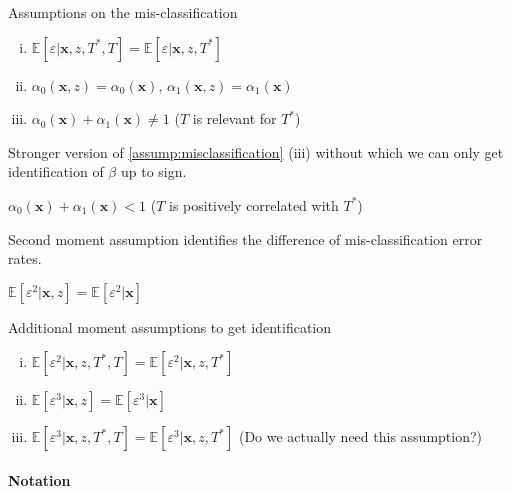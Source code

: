 \documentclass[12pt]{article}
\begin{document}
\noindent Assumptions on the mis-classification
\begin{assump} \mbox{}
  \label{assump:misclassification}
  \begin{enumerate}[(i)] 
    \item $\mathbb{E}[\varepsilon|\mathbf{x},z,T^*,T] = \mathbb{E}[\varepsilon|\mathbf{x},z, T^*]$
    \item $\alpha_0(\mathbf{x},z) = \alpha_0(\mathbf{x})$,   $\alpha_1(\mathbf{x},z) = \alpha_1(\mathbf{x})$
    \item $\alpha_0(\mathbf{x}) + \alpha_1(\mathbf{x}) \neq 1$ ($T$ is relevant for $T^*$)
  \end{enumerate}
\end{assump}

\noindent Stronger version of \ref{assump:misclassification} (iii) without which we can only get identification of $\beta$ up to sign.
\begin{assump}
  \label{assump:extent}
  $\alpha_0(\mathbf{x}) + \alpha_1(\mathbf{x}) <1$ ($T$ is positively correlated with $T^*$)
\end{assump}

\noindent Second moment assumption identifies the difference of mis-classification error rates.
\begin{assump} \mbox{}
  \label{assump:2ndMoment}
    $\mathbb{E}[\varepsilon^2|\mathbf{x},z] = \mathbb{E}[\varepsilon^2|\mathbf{x}]$ 
\end{assump}

\noindent Additional moment assumptions to get identification
\begin{assump} \mbox{}
  \begin{enumerate}[(i)] 
    \item $\mathbb{E}[\varepsilon^2|\mathbf{x},z,T^*,T] = \mathbb{E}[\varepsilon^2|\mathbf{x},z, T^*]$
    \item $\mathbb{E}[\varepsilon^3|\mathbf{x},z] = \mathbb{E}[\varepsilon^3|\mathbf{x}]$
    \item $\mathbb{E}[\varepsilon^3|\mathbf{x},z,T^*,T] = \mathbb{E}[\varepsilon^3|\mathbf{x},z, T^*]$ (Do we actually need this assumption?)
  \end{enumerate}
\end{assump}



\paragraph{Notation}
\end{document}

